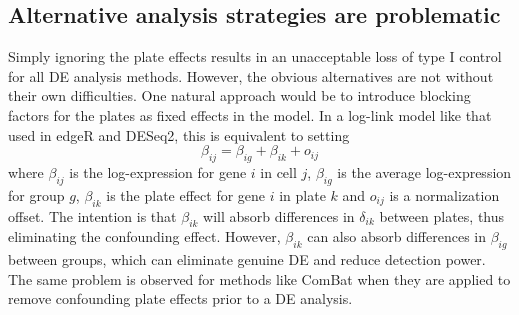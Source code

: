 \documentclass[oupdraft]{bio}
\begin{document}
\subsection{Alternative analysis strategies are problematic}
Simply ignoring the plate effects results in an unacceptable loss of type I control for all DE analysis methods.
However, the obvious alternatives are not without their own difficulties.
One natural approach would be to introduce blocking factors for the plates as fixed effects in the model.
In a log-link model like that used in edgeR and DESeq2, this is equivalent to setting
\[
    \beta_{ij} = \beta_{ig} + \beta_{ik} + o_{ij}
\]
where $\beta_{ij}$ is the log-expression for gene $i$ in cell $j$, $\beta_{ig}$ is the average log-expression for group $g$, 
    $\beta_{ik}$ is the plate effect for gene $i$ in plate $k$ and $o_{ij}$ is a normalization offset.
The intention is that $\beta_{ik}$ will absorb differences in $\delta_{ik}$ between plates, thus eliminating the confounding effect.
However, $\beta_{ik}$ can also absorb differences in $\beta_{ig}$ between groups, which can eliminate genuine DE and reduce detection power.
The same problem is observed for methods like ComBat \citep{johnson2007adjusting} when they are applied to remove confounding plate effects prior to a DE analysis.
\end{document}
